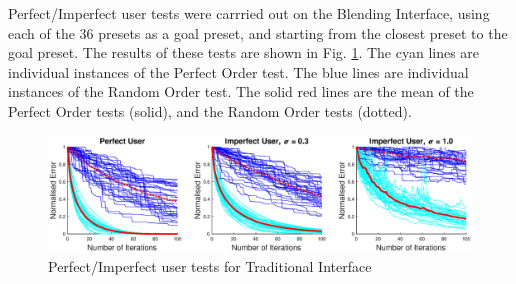 \documentclass[11pt, oneside]{report}   	%
\begin{document}
Perfect/Imperfect user tests were carrried out on the Blending Interface, using each of the 36 presets as a goal preset, and starting from the closest preset to the goal preset. The results of these tests are shown in Fig. \ref{fig:TradTest1}. The cyan lines are individual instances of the Perfect Order test. The blue lines are individual instances of the Random Order test. The solid red lines are the mean of the Perfect Order tests (solid), and the Random Order tests (dotted). 
\begin{figure}[h]
	\centering
	\hspace{-10pt}
	\includegraphics[trim  ={3cm, 0cm, 3cm, 0cm}, clip, width = 6.5in]{TradInterfaceTests1b.eps}
	\vspace{-5pt}
	\caption{Perfect/Imperfect user tests for Traditional Interface}
	\label{fig:TradTest1}
	\vspace{-15pt}
\end{figure}
\end{document}
